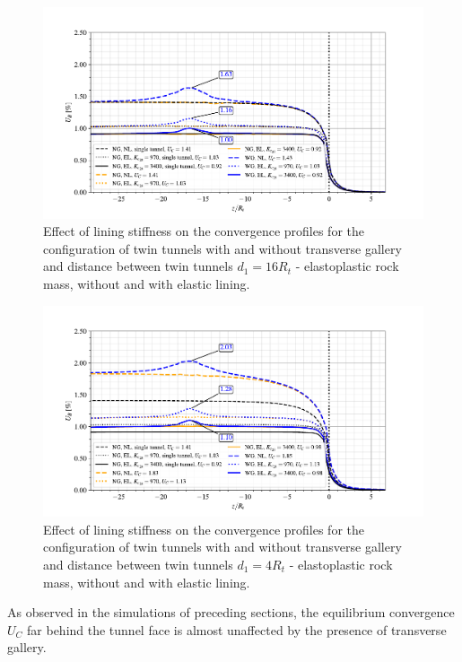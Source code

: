 \documentclass[a4paper,fleqn]{cas-sc}
\begin{document}
\begin{figure}[h!]
	\centering
	\includegraphics[scale=0.9]{Convergence Profiles - EP_d1_16Ri_anotate.pdf}
	\caption{Effect of lining stiffness on the convergence profiles for the configuration of twin tunnels with and without transverse gallery and distance between twin tunnels $d_1=16R_t$ - elastoplastic rock mass, without and with elastic lining.}
	\label{EP_d1_16Ri}
\end{figure}
\FloatBarrier
\begin{figure}[h!]
	\centering
	\includegraphics[scale=0.9]{Convergence Profiles - EP_d1_4Ri_anotate.pdf}
	\caption{Effect of lining stiffness on the convergence profiles for the configuration of twin tunnels with and without transverse gallery and distance between twin tunnels $d_1=4R_t$ - elastoplastic rock mass, without and with elastic lining.}
	\label{EP_d1_4Ri}
\end{figure}
\FloatBarrier

As observed in the simulations of preceding sections, the equilibrium convergence $U_C$ far behind the tunnel face is almost unaffected by the presence of transverse gallery. 
\end{document}
